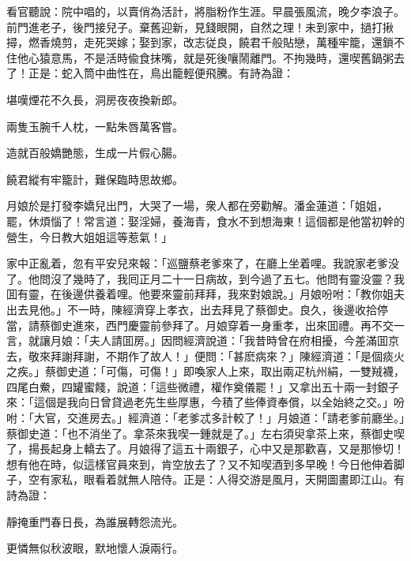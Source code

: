 看官聽說：院中唱的，以賣俏為活計，將脂粉作生涯。早晨張風流，晚夕李浪子。前門進老子，後門接兒子。棄舊迎新，見錢眼開，自然之理！未到家中，撾打揪撏，燃香燒剪，走死哭嫁；娶到家，改志従良，饒君千般貼戀，萬種牢籠，還鎖不住他心猿意馬，不是活時偸食抹嘴，就是死後嚷鬧離門。不拘幾時，還喫舊鍋粥去了！正是：蛇入筒中曲性在，鳥出籠輕便飛騰。有詩為證：

堪嘆煙花不久長，洞房夜夜換新郎。

兩隻玉腕千人枕，一點朱唇萬客嘗。

造就百般嬌艷態，生成一片假心腸。

饒君縱有牢籠計，難保臨時思故鄉。

月娘於是打發李嬌兒出門，大哭了一場，衆人都在旁勸解。潘金蓮道：「姐姐，罷，休煩惱了！常言道：娶淫婦，養海青，食水不到想海東！這個都是他當初幹的營生，今日教大姐姐這等惹氣！」

家中正亂着，忽有平安兒來報：「巡鹽蔡老爹來了，在廳上坐着哩。我說家老爹没了。他問沒了幾時了，我囘正月二十一日病故，到今過了五七。他問有靈没靈？我囬有靈，在後邊供養着哩。他要來靈前拜拜，我來對娘說。」月娘吩咐：「教你姐夫出去見他。」不一時，陳經濟穿上孝衣，出去拜見了蔡御史。良久，後邊收拾停當，請蔡御史進來，西門慶靈前參拜了。月娘穿着一身重孝，出來囬禮。再不交一言，就讓月娘：「夫人請囬房。」因問經濟說道：「我昔時曾在府相擾，今差滿囬京去，敬來拜謝拜謝，不期作了故人！」便問：「甚麽病來？」陳經濟道：「是個痰火之疾。」蔡御史道：「可傷，可傷！」即喚家人上來，取出兩疋杭州絹，一雙羢襪，四尾白鮝，四罐蜜餞，說道：「這些微禮，權作奠儀罷！」又拿出五十兩一封銀子來：「這個是我向日曾貸過老先生些厚惠，今積了些俸資奉償，以全始終之交。」吩咐：「大官，交進房去。」經濟道：「老爹忒多計較了！」月娘道：「請老爹前廳坐。」蔡御史道：「也不消坐了。拿茶來我喫一鍾就是了。」左右須臾拿茶上來，蔡御史喫了，揚長起身上轎去了。月娘得了這五十兩銀子，心中又是那歡喜，又是那慘切！想有他在時，似這樣官員來到，肯空放去了？又不知喫酒到多早晚！今日他伸着脚子，空有家私，眼看着就無人陪侍。正是：人得交游是風月，天開圖畫即江山。有詩為證：

靜掩重門春日長，為誰展轉怨流光。

更憐無似秋波眼，默地懷人淚兩行。

